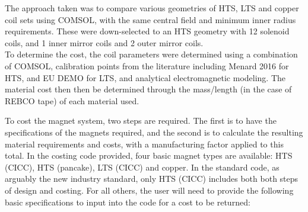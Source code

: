The approach taken was to compare various geometries of HTS, LTS and copper coil sets using COMSOL, with the same central field and minimum inner radius requirements. These were down-selected to an HTS geometry with 12 solenoid coils, and 1 inner mirror coils and 2 outer mirror coils.\\

To determine the cost, the coil parameters were determined using a combination of COMSOL, calibration points from the literature including Menard 2016 \cite{Menard2016} for HTS, and EU DEMO for LTS, and analytical electromagnetic modeling. The material cost then then be determined through the mass/length (in the case of REBCO tape) of each material used. 

To cost the magnet system, two steps are required. The first is to have the specifications of the magnets required, and the second is to calculate the resulting material requirements and costs, with a manufacturing factor applied to this total. In the costing code provided, four basic magnet types are available: HTS (CICC), HTS (pancake), LTS (CICC) and copper. In the standard code, as arguably the new industry standard, only HTS (CICC) includes both both steps of design and costing. For all others, the user will need to provide the following basic specifications to input into the code for a cost to be returned:

